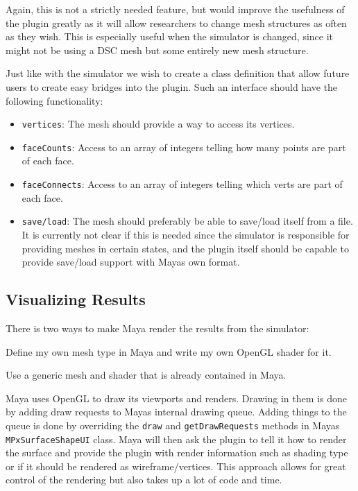 Again, this is not a strictly needed feature, but would improve the usefulness
of the plugin greatly as it will allow researchers to change mesh structures as
often as they wish. This is especially useful when the simulator is changed,
since it might not be using a DSC mesh but some entirely new mesh structure.

Just like with the simulator we wish to create a class definition that allow
future users to create easy bridges into the plugin. Such an interface should
have the following functionality:
\begin{itemize}
  \item \texttt{vertices}: The mesh should provide a way to access its vertices.
  \item \texttt{faceCounts}: Access to an array of integers telling how many
    points are part of each face.
  \item \texttt{faceConnects}: Access to an array of integers telling which
    verts are part of each face.
  \item \texttt{save/load}: The mesh should preferably be able to save/load
    itself from a file. It is currently not clear if this is needed since the
    simulator is responsible for providing meshes in certain states, and the
    plugin itself should be capable to provide save/load support with Mayas own
    format.
\end{itemize}


\subsection{Visualizing Results}

There is two ways to make Maya render the results from the simulator:
\begin{enumerate*}
  \item Define my own mesh type in Maya and write my own OpenGL shader for it.
  \item Use a generic mesh and shader that is already contained in Maya.
\end{enumerate*}

Maya uses OpenGL to draw its viewports and renders. Drawing in them is done by
adding draw requests to Mayas internal drawing queue.  Adding things to the
queue is done by overriding the \texttt{draw} and \texttt{getDrawRequests}
methods in Mayas \texttt{MPxSurfaceShapeUI} class. Maya will then ask the plugin
to tell it how to render the surface and provide the plugin with render
information such as shading type or if it should be rendered as
wireframe/vertices. This approach allows for great control of the rendering but
also takes up a lot of code and time.

